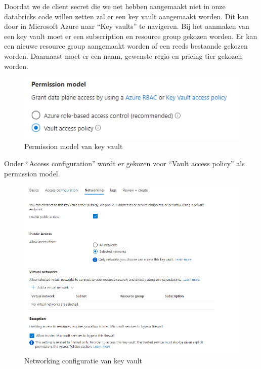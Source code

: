 Doordat we de client secret die we net hebben aangemaakt niet in onze databricks code willen zetten zal er een key vault aangemaakt worden. Dit kan door in Microsoft Azure naar ``Key vaults'' te navigeren. Bij het aanmaken van een key vault moet er een subscription en resource group gekozen worden. Er kan een nieuwe resource group aangemaakt worden of een reeds bestaande gekozen worden. Daarnaast moet er een naam, gewenste regio en pricing tier gekozen worden.

\begin{figure}[H]
    \centering
    \includegraphics[width=1\textwidth]{./graphics/databricks/connection_9.png}
    \caption{Permission model van key vault}
\end{figure}

Onder ``Access configuration'' wordt er gekozen voor ``Vault access policy'' als permission model.

\begin{figure}[H]
    \centering
    \includegraphics[width=1\textwidth]{./graphics/databricks/connection_10.png}
    \caption{Networking configuratie van key vault}
\end{figure}

